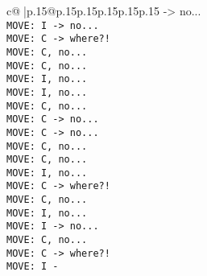 \documentclass{article}
\begin{document}
{\begin{supertabular}{c@{$\;$}|p{.15\linewidth}@{}p{.15\linewidth}p{.15\linewidth}p{.15\linewidth}p{.15\linewidth}p{.15\linewidth}}
{{{-> no...\\ \tt  MOVE: I -> no...\\ \tt  MOVE: C -> where?!\\ \tt  MOVE: C, no...\\ \tt  MOVE: C, no...\\ \tt  MOVE: I, no...\\ \tt  MOVE: I, no...\\ \tt  MOVE: C, no...\\ \tt  MOVE: C -> no...\\ \tt  MOVE: C -> no...\\ \tt  MOVE: C, no...\\ \tt  MOVE: C, no...\\ \tt  MOVE: I, no...\\ \tt  MOVE: C -> where?!\\ \tt  MOVE: C, no...\\ \tt  MOVE: I, no...\\ \tt  MOVE: I -> no...\\ \tt  MOVE: C, no...\\ \tt  MOVE: C -> where?!\\ \tt  MOVE: I -}}}
\end{supertabular}}
\end{document}
